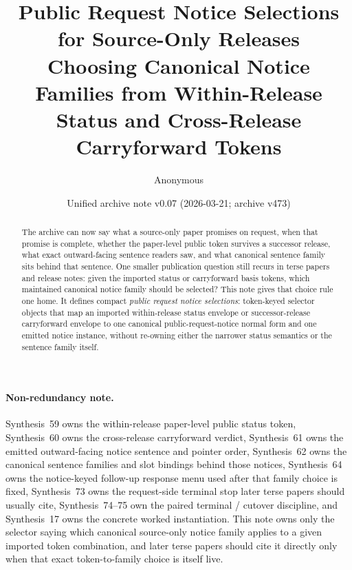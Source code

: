 \documentclass[11pt]{article}
\title{Public Request Notice Selections for Source-Only Releases\\\large Choosing Canonical Notice Families from Within-Release Status and Cross-Release Carryforward Tokens}
\author{Anonymous}
\date{Unified archive note v0.07 (2026-03-21; archive v473)}
\begin{document}
\maketitle

\begin{abstract}
The archive can now say what a source-only paper promises on request, when that promise is complete, whether the paper-level public token survives a successor release, what exact outward-facing sentence readers saw, and what canonical sentence family sits behind that sentence. One smaller publication question still recurs in terse papers and release notes: given the imported status or carryforward basis tokens, which maintained canonical notice family should be selected? This note gives that choice rule one home. It defines compact \emph{public request notice selections}: token-keyed selector objects that map an imported within-release status envelope or successor-release carryforward envelope to one canonical public-request-notice normal form and one emitted notice instance, without re-owning either the narrower status semantics or the sentence family itself.
\end{abstract}

\paragraph{Non-redundancy note.}
Synthesis~59 owns the within-release paper-level public status token, Synthesis~60 owns the cross-release carryforward verdict, Synthesis~61 owns the emitted outward-facing notice sentence and pointer order, Synthesis~62 owns the canonical sentence families and slot bindings behind those notices, Synthesis~64 owns the notice-keyed follow-up response menu used after that family choice is fixed, Synthesis~73 owns the request-side terminal stop later terse papers should usually cite, Synthesis~74--75 own the paired terminal / cutover discipline, and Synthesis~17 owns the concrete worked instantiation.\cite{series:publicrequeststatusenvelopes,series:publicrequestcarryforward,series:publicrequestnotices,series:publicrequestnoticenormalforms,series:publicrequestresponsemenus,series:publicrequestresponsepacketrefreshresponsepacketclosureverdicts,series:pairedterminalcitationdiscipline,series:pairedterminalcutoverrule,series:workedexample}
This note owns only the selector saying which canonical source-only notice family applies to a given imported token combination, and later terse papers should cite it directly only when that exact token-to-family choice is itself live.
\end{document}
